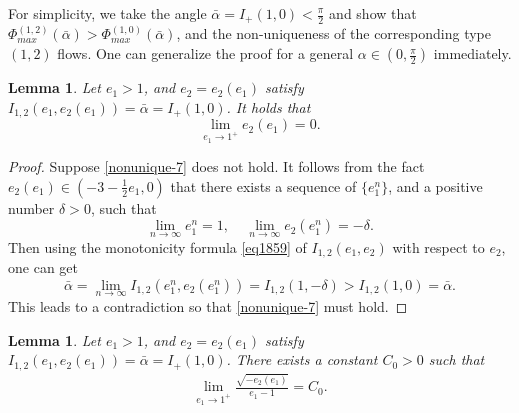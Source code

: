 \documentclass[reqno,12pt]{amsart}
\newtheorem{lemma}[theorem]{Lemma}
\begin{document}
For simplicity, we take the angle $\bar{\alpha} = I_{+}(1, 0)<\frac{\pi}{2}$ and show that $\Phi_{max}^{(1, 2)}(\bar{\alpha}) > \Phi_{max}^{(1, 0)}(\bar{\alpha})$, and the non-uniqueness of the corresponding type $(1, 2)$ flows. One can generalize the proof for a general $\alpha\in(0,\frac{\pi}{2})$ immediately.

\begin{lemma}\label{Lemmanonunique-2}
Let $e_1 > 1$, and $e_2 = e_2(e_1)$ satisfy $I_{1, 2}(e_1, e_2(e_1)) = \bar{\alpha} =I_{+}(1, 0)$. It holds that 
    \begin{equation}\label{nonunique-7}
\lim_{e_1 \to 1^+} e_2(e_1) = 0. 
    \end{equation}
    \end{lemma}

\begin{proof}
Suppose \eqref{nonunique-7} does not hold. It follows from the fact   $ e_2(e_1)\in (-3-\frac12 e_1 ,0)$ that there exists a sequence of $\{e_1^n\}$, and a positive number $\delta >0$, such that 
\begin{equation*}
    \lim_{n\to \infty} e_1^n =1,\ \ \ \ \ \lim_{n\to \infty}e_2(e_1^n) = -\delta.
\end{equation*}
Then using the monotonicity formula \eqref{eq1859} of $I_{1,2}(e_1,e_2)$ with respect to $e_2$, one can get
\begin{equation*}
    \bar{\alpha} = \lim_{n\to \infty} I_{1, 2}(e_1^n, e_2(e_1^n)) = I_{1, 2}(1, -\delta) > I_{1, 2}(1, 0) = \bar{\alpha}.
\end{equation*}
This leads to a contradiction so that \eqref{nonunique-7} must hold. 
\end{proof}

\begin{lemma}\label{Lemmanonunique-3}
Let $e_1 > 1$, and $e_2 = e_2(e_1)$ satisfy $I_{1, 2}(e_1, e_2(e_1)) = \bar{\alpha} =I_{+}(1, 0)$. 
There exists a constant $C_0>0$ such that 
\begin{align*}
    \lim_{e_1 \to 1^+} \frac{\sqrt{-e_2(e_1)}}{e_1-1} = C_0. 
\end{align*}
\end{lemma}
\end{document}
